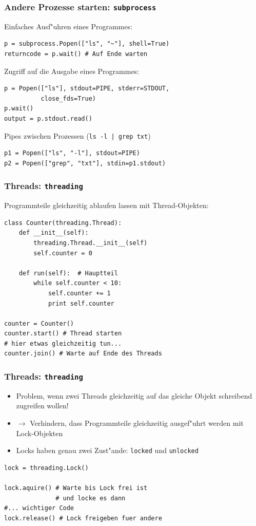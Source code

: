 \begin{frame}[fragile]
\frametitle{Andere Prozesse starten: \texttt{subprocess}}
Einfaches Ausf"uhren eines Programmes:
\begin{lstlisting}[style=Python]
p = subprocess.Popen(["ls", "~"], shell=True)
returncode = p.wait() # Auf Ende warten
\end{lstlisting}
Zugriff auf die Ausgabe eines Programmes:
\begin{lstlisting}[style=Python]
p = Popen(["ls"], stdout=PIPE, stderr=STDOUT, 
          close_fds=True)
p.wait()
output = p.stdout.read()
\end{lstlisting}
Pipes zwischen Prozessen (\lstinline{ls -l | grep txt})
\begin{lstlisting}[style=Python]
p1 = Popen(["ls", "-l"], stdout=PIPE)
p2 = Popen(["grep", "txt"], stdin=p1.stdout)
\end{lstlisting}
\end{frame}

\begin{frame}[fragile]
\frametitle{Threads: \texttt{threading}}
Programmteile gleichzeitig ablaufen lassen mit \alert{Thread-Objekten}:
\begin{lstlisting}[style=Python]
class Counter(threading.Thread):
    def __init__(self):
        threading.Thread.__init__(self)
        self.counter = 0

    def run(self):  # Hauptteil
        while self.counter < 10:
            self.counter += 1
            print self.counter

counter = Counter()
counter.start() # Thread starten
# hier etwas gleichzeitig tun...
counter.join() # Warte auf Ende des Threads
\end{lstlisting}
\end{frame}

\begin{frame}[fragile]
\frametitle{Threads: \texttt{threading}}
\begin{itemize}
\item Problem, wenn zwei Threads gleichzeitig auf das gleiche Objekt schreibend zugreifen wollen!
\item $\rightarrow$ Verhindern, dass Programmteile gleichzeitig ausgef"uhrt werden mit \alert{Lock-Objekten}
\item Locks haben genau zwei Zust"ande: \texttt{locked} und \texttt{unlocked}
\end{itemize}
\begin{lstlisting}[style=Python]
lock = threading.Lock()

lock.aquire() # Warte bis Lock frei ist
              # und locke es dann 
#... wichtiger Code
lock.release() # Lock freigeben fuer andere
\end{lstlisting}
\end{frame}


